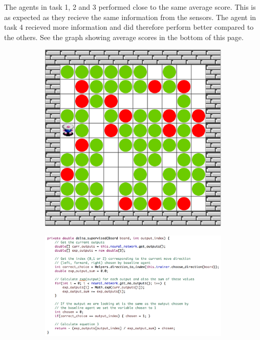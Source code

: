 \documentclass{article}
\begin{document}
\newpage
The agents in task 1, 2 and 3 performed close to the same average score. This is as expected as they recieve the same information from the sensors. The agent in task 4 recieved
more information and did therefore perform better compared to the others. See the graph showing average scores in the bottom of this page. 

\begin{figure}[h]
  \centering
  \begin{subfigure}{.5\textwidth}
    \centering
    \includegraphics[scale=0.35]{png/flatland.png}
  \end{subfigure}%
  \begin{subfigure}{.5\textwidth}
    \centering
    \includegraphics[scale=0.4]{png/delta_supervised.png}
  \end{subfigure}
\end{figure}
\end{document}
